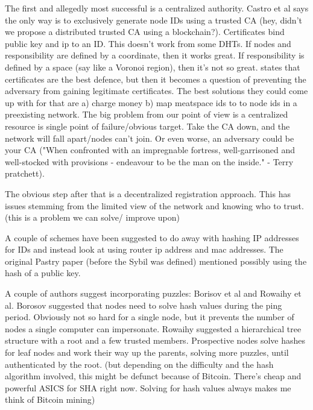 \documentclass[10pt,letterpaper]{report}
\begin{document}
The first and allegedly most successful is a centralized authority.  Castro et al says the only way is to exclusively generate node IDs using a trusted CA (hey, didn't we propose a distributed trusted CA using a blockchain?).   Certificates bind public key and ip to an ID. This doesn't work from some DHTs.  If nodes and responsibility are defined by a coordinate, then it works great.  If responsibility is defined by a space (say like a Voronoi region), then it's not so great.  \cite{dhtsec} states that certificates are the best defence, but then it becomes a question of preventing the adversary from gaining legitimate certificates.  The best solutions they could come up with for that are a) charge money b) map meatspace ids to to node ids in a preexisting network.  The big problem from our point of view is a centralized resource is single point of failure/obvious target.   Take the CA down, and the network will fall apart/nodes can't join.  Or even worse, an adversary could be your CA ("When confronted with an impregnable fortress, well-garrisoned and well-stocked with provisions - endeavour to be the man on the inside." - Terry pratchett).

The obvious step after that is a decentralized registration approach. This has issues stemming from the limited view of the network and knowing who to trust.  (this is a problem we can solve/ improve upon)

A couple of schemes have been suggested to do away with hashing  IP addresses for IDs and instead  look at using router ip address and mac addresses.   The original Pastry paper (before the Sybil was defined) mentioned possibly using the hash of a public key.

A couple of authors suggest incorporating puzzles: Borisov et al and Rowaihy et al.  Borosov suggested that nodes need to solve hash values during the ping period.  Obviously not so hard for a single node, but it prevents the number of nodes a single computer can impersonate.  Rowaihy suggested a hierarchical tree structure with a root and a few trusted members. Prospective nodes solve hashes for leaf nodes and work their way up the parents, solving more puzzles, until authenticated by the root.   (but depending on the difficulty  and the hash algorithm involved, this might be defunct because of Bitcoin.  There's cheap and powerful ASICS for SHA right now.  Solving for hash values always makes me think of Bitcoin mining)
\end{document}
